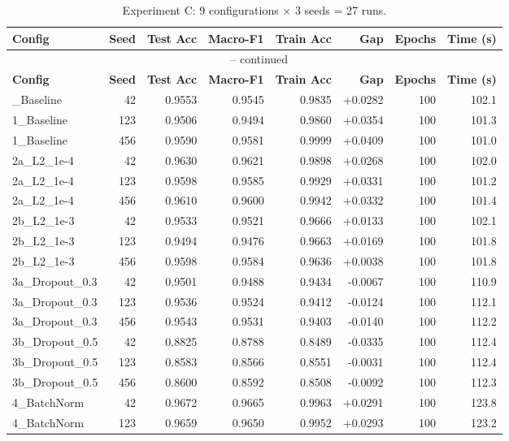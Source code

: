 \documentclass[10pt,letterpaper]{article}
\begin{document}
\begin{longtable}{lrrrrrrr}
\caption{Experiment C: 9 configurations $\times$ 3 seeds = 27 runs.}\label{tab:appD-expC}\\
\toprule
\textbf{Config} & \textbf{Seed} & \textbf{Test Acc} & \textbf{Macro-F1} & \textbf{Train Acc} & \textbf{Gap} & \textbf{Epochs} & \textbf{Time (s)} \\
\midrule
\endfirsthead
\multicolumn{8}{c}{\tablename\ \thetable{} -- continued}\\
\toprule
\textbf{Config} & \textbf{Seed} & \textbf{Test Acc} & \textbf{Macro-F1} & \textbf{Train Acc} & \textbf{Gap} & \textbf{Epochs} & \textbf{Time (s)} \\
\midrule
\endhead
\bottomrule
\endfoot
1\_Baseline & 42 & 0.9553 & 0.9545 & 0.9835 & +0.0282 & 100 & 102.1 \\
1\_Baseline & 123 & 0.9506 & 0.9494 & 0.9860 & +0.0354 & 100 & 101.3 \\
1\_Baseline & 456 & 0.9590 & 0.9581 & 0.9999 & +0.0409 & 100 & 101.0 \\
2a\_L2\_1e-4 & 42 & 0.9630 & 0.9621 & 0.9898 & +0.0268 & 100 & 102.0 \\
2a\_L2\_1e-4 & 123 & 0.9598 & 0.9585 & 0.9929 & +0.0331 & 100 & 101.2 \\
2a\_L2\_1e-4 & 456 & 0.9610 & 0.9600 & 0.9942 & +0.0332 & 100 & 101.4 \\
2b\_L2\_1e-3 & 42 & 0.9533 & 0.9521 & 0.9666 & +0.0133 & 100 & 102.1 \\
2b\_L2\_1e-3 & 123 & 0.9494 & 0.9476 & 0.9663 & +0.0169 & 100 & 101.8 \\
2b\_L2\_1e-3 & 456 & 0.9598 & 0.9584 & 0.9636 & +0.0038 & 100 & 101.8 \\
3a\_Dropout\_0.3 & 42 & 0.9501 & 0.9488 & 0.9434 & -0.0067 & 100 & 110.9 \\
3a\_Dropout\_0.3 & 123 & 0.9536 & 0.9524 & 0.9412 & -0.0124 & 100 & 112.1 \\
3a\_Dropout\_0.3 & 456 & 0.9543 & 0.9531 & 0.9403 & -0.0140 & 100 & 112.2 \\
3b\_Dropout\_0.5 & 42 & 0.8825 & 0.8788 & 0.8489 & -0.0335 & 100 & 112.4 \\
3b\_Dropout\_0.5 & 123 & 0.8583 & 0.8566 & 0.8551 & -0.0031 & 100 & 112.4 \\
3b\_Dropout\_0.5 & 456 & 0.8600 & 0.8592 & 0.8508 & -0.0092 & 100 & 112.3 \\
4\_BatchNorm & 42 & 0.9672 & 0.9665 & 0.9963 & +0.0291 & 100 & 123.8 \\
4\_BatchNorm & 123 & 0.9659 & 0.9650 & 0.9952 & +0.0293 & 100 & 123.2 \\

\end{longtable}
\end{document}
